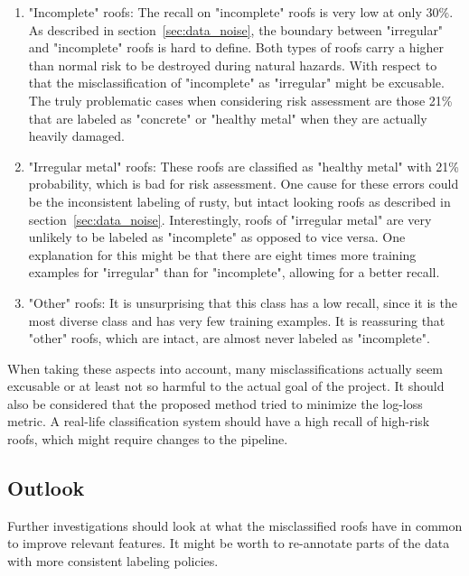 \documentclass[11pt]{article}
\begin{document}
	\begin{enumerate}
		\item "Incomplete" roofs: The recall on "incomplete" roofs is very low at only 30\%. As described in section~\ref{sec:data_noise}, the boundary between "irregular" and "incomplete" roofs is hard to define. Both types of roofs carry a higher than normal risk to be destroyed during natural hazards. With respect to that the misclassification of "incomplete" as "irregular" might be excusable. The truly problematic cases when considering risk assessment are those 21\% that are labeled as "concrete" or "healthy metal" when they are actually heavily damaged.
		
		\item "Irregular metal" roofs: These roofs are classified as "healthy metal" with 21\% probability, which is bad for risk assessment. One cause for these errors could be the inconsistent labeling of rusty, but intact looking roofs as described in section~\ref{sec:data_noise}. Interestingly, roofs of "irregular metal" are very unlikely to be labeled as "incomplete" as opposed to vice versa. One explanation for this might be that there are eight times more training examples for "irregular" than for "incomplete", allowing for a better recall.
		
		\item "Other" roofs: It is unsurprising that this class has a low recall, since it is the most diverse class and has very few training examples. It is reassuring that "other" roofs, which are intact, are almost never labeled as "incomplete". 
	\end{enumerate}

	When taking these aspects into account, many misclassifications actually seem excusable or at least not so harmful to the actual goal of the project. It should also be considered that the proposed method tried to minimize the log-loss metric. A real-life classification system should have a high recall of high-risk roofs, which might require changes to the pipeline.
	
	\subsection{Outlook}
	
	Further investigations should look at what the misclassified roofs have in common to improve relevant features. It might be worth to re-annotate parts of the data with more consistent labeling policies.\\
	
\end{document}

